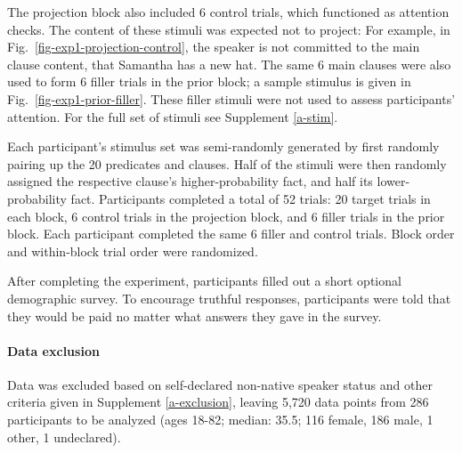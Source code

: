 \documentclass[11pt,fleqn]{article}
\newcommand{\6}{\mbox{$[\hspace*{-.6mm}[$}}
\newcommand{\9}{\mbox{$]\hspace*{-.6mm}]$}}
\begin{document}



The projection block also included 6 control trials, which functioned as attention checks. The content of these stimuli was expected not to project: For example, in Fig.~\ref{fig-exp1-projection-control}, the speaker is not committed to the main clause content, that Samantha has a new hat. The same 6 main clauses were also used to form 6 filler trials in the prior block; a sample stimulus is given in Fig.~\ref{fig-exp1-prior-filler}. These filler stimuli were not used to assess participants' attention. For the full set of stimuli see Supplement \ref{a-stim}.


Each participant's stimulus set was semi-randomly generated by first randomly pairing up the 20 predicates and clauses. Half of the stimuli were then randomly assigned the respective clause's higher-probability fact, and half its lower-probability fact. Participants completed a total of 52 trials: 20 target trials in each block, 6 control trials in the projection block, and 6 filler trials in the prior block. Each participant completed the same 6 filler and control trials. Block order and within-block trial order were randomized.



After completing the experiment, participants filled out a short optional demographic survey. To encourage truthful responses, participants were told that they would be paid no matter what answers they gave in the survey.

\paragraph{Data exclusion} Data was excluded based on self-declared non-native speaker status and other criteria given in Supplement \ref{a-exclusion}, leaving %
5,720 data points from 286 participants to be analyzed (ages 18-82; median: 35.5; 116 female, 186 male, 1 other, 1 undeclared).
\end{document}
